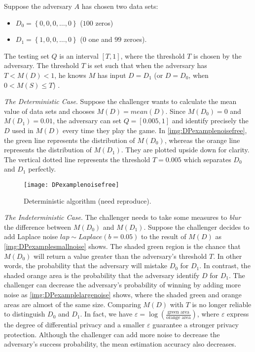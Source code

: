 Suppose the adversary $A$ has chosen two data sets:
\begin{itemize}
    \item $D_{0}=\left\{ 0, 0, 0,\ldots ,0\right\} $ ($100$ zeros)
    \item $D_{1}=\left\{ 1, 0, 0,\ldots ,0\right\} $ ($0$ one and $99$ zeroes).
\end{itemize}

The testing set $Q$ is an interval $\left[ T,1\right] $, where the threshold $T$ is chosen by the adversary. The threshold $T$ is set such that when the adversary has $T<M\left( D\right) < 1$, he knows $M$ has input $D=D_{1}$ (or $D=D_{0}$, when $0<M\left( S\right) \leq T$) .

\textit{The Deterministic Case}. Suppose the challenger wants to calculate the mean value of data sets and  chooses $M\left( D\right) =mean\left( D \right) $. Since $M\left( D_{0}\right) =0$ and $M\left( D_{1}\right) =0.01$, the adversary can set $Q =\left[ 0.005,1\right] $ and identify precisely the $D$ used in $M\left( D\right) $ every time they play the game. In \autoref{img:DPexamplenoisefree}, the green line represents the distribution of $M\left( D_{0}\right)$, whereas the orange line represents the distribution of $M\left( D_{1}\right)$. They are plotted upside down for clarity. The vertical dotted line represents the threshold $T=0.005$ which separates $D_{0}$ and $D_{1}$ perfectly.

\begin{figure}[htbp]
    \texttt{[image: DPexamplenoisefree]}
    \centering
    \caption{Deterministic algorithm (need reproduce).}
    \label{img:DPexamplenoisefree}
\end{figure}
\FloatBarrier

\textit{The Indeterministic Case}. The challenger needs to take some measures to \textit{blur} the difference between $M\left( D_{0}\right)$ and $M\left( D_{1}\right)$. Suppose the challenger decides to add Laplace noise $lap\sim Laplace\left(b=0.05\right)$ to the result of $M\left(D\right)$ as \autoref{img:DPexamplesmallnoise} shows. The shaded green region is the chance that $M\left( D_{0}\right)$ will return a value greater than the adversary's threshold $T$. In other words, the probability that the adversary will mistake $D_{0}$ for $D_{1}$. In contrast, the shaded orange area is the probability that the adversary identify $D$ for $D_{1}$. The challenger can decrease the adversary's probability of winning by adding more noise as \autoref{img:DPexamplelargenoise} shows, where the shaded green and orange areas are almost of the same size. Comparing $M\left( D\right)$ with $T$ is no longer reliable to distinguish $D_{0}$ and $D_{1}$. In fact, we have
$\varepsilon=\log \left( \frac{\text{green area}}{\text{orange area}}\right) $, where $\varepsilon$ express the degree of differential privacy and a smaller $\varepsilon$ guarantee a stronger privacy protection. Although the challenger can add more noise to decrease the adversary's success probability, the mean estimation accuracy also decreases.


